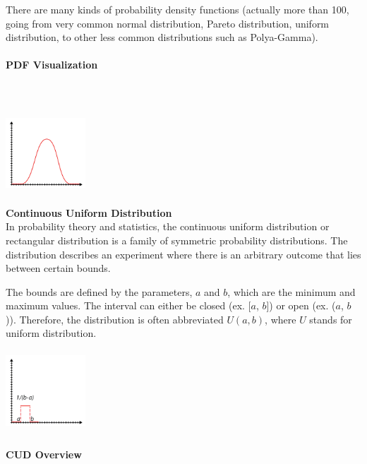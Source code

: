 \documentclass{article}
\begin{document}
There are many kinds of probability density functions (actually more than 100, going from very common normal distribution, Pareto distribution, uniform distribution, to other less common distributions such as Polya-Gamma). 

\paragraph{PDF Visualization}\mbox{} \\
\mbox{} \\

\includegraphics[width=3cm, height=3cm]{pdf}

\textbf{Continuous Uniform Distribution} \\
In probability theory and statistics, the continuous uniform distribution or rectangular distribution is a family of symmetric probability distributions. The distribution describes an experiment where there is an arbitrary outcome that lies between certain bounds. 

The bounds are defined by the parameters, $a$ and $b$, which are the minimum and maximum values. The interval can either be closed (ex. [$a$, $b$]) or open (ex. ($a$, $b$)).
Therefore, the distribution is often abbreviated $U (a, b)$, where $U$ stands for uniform distribution.

\includegraphics[width=3cm, height=3cm]{cud}

\paragraph{CUD Overview}\mbox{} \\
\end{document}
